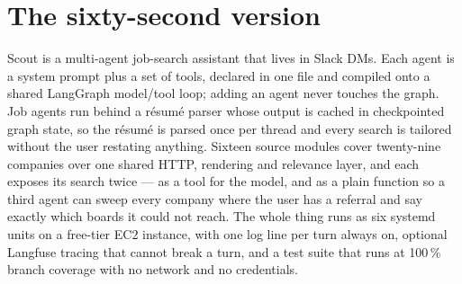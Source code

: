 \documentclass[11pt,a4paper]{article}
\begin{document}
\section{The sixty-second version}

\noindent
Scout is a multi-agent job-search assistant that lives in Slack DMs. Each agent is a system
prompt plus a set of tools, declared in one file and compiled onto a shared LangGraph
model/tool loop; adding an agent never touches the graph. Job agents run behind a résumé
parser whose output is cached in checkpointed graph state, so the résumé is parsed once per
thread and every search is tailored without the user restating anything. Sixteen source
modules cover twenty-nine companies over one shared HTTP, rendering and relevance layer, and
each exposes its search twice --- as a tool for the model, and as a plain function so a third
agent can sweep every company where the user has a referral and say exactly which boards it
could not reach. The whole thing runs as six systemd units on a free-tier EC2 instance, with
one log line per turn always on, optional Langfuse tracing that cannot break a turn, and a
test suite that runs at 100\,\% branch coverage with no network and no credentials.
\end{document}

